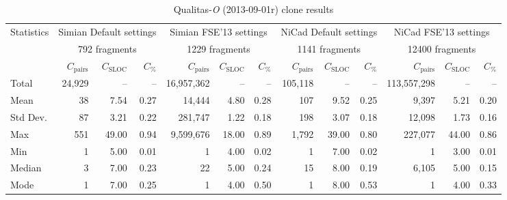 \documentclass{sig-alternate-05-2015}
\begin{document}
\begin{table}[h]
	\centering
	\caption{Qualitas-\textit{O} (2013-09-01r) clone results}
	\label{t_simian_raw_results}
	\small
		\begin{tabular}{l|r|r|r|r|r|r|r|r|r|r|r|r}
			\hline
			\multirow{3}{*}{Statistics} 
			& \multicolumn{3}{c|}{Simian Default settings} 
			& \multicolumn{3}{c|}{Simian FSE'13 settings}
			& \multicolumn{3}{c|}{NiCad Default settings} 
			& \multicolumn{3}{c}{NiCad FSE'13 settings} \\ \cline{2-13} 
			& \multicolumn{3}{c|}{792 fragments} 
			& \multicolumn{3}{c|}{1229 fragments}  
			& \multicolumn{3}{c|}{1141 fragments} 
			& \multicolumn{3}{c}{12400 fragments} \\ \cline{2-13}
			& $C_{\mathrm{pairs}}$ & $C_{\mathrm{SLOC}}$ & $C_{\mathrm{\%}}$ 
			& $C_{\mathrm{pairs}}$ & $C_{\mathrm{SLOC}}$ & $C_{\mathrm{\%}}$ 
			& $C_{\mathrm{pairs}}$ & $C_{\mathrm{SLOC}}$ & $C_{\mathrm{\%}}$
			& $C_{\mathrm{pairs}}$ & $C_{\mathrm{SLOC}}$ & $C_{\mathrm{\%}}$ \\ 
			\hline
			Total & 24,929 & -- & -- & 16,957,362 & --	& -- & 105,118 	& -- & -- & 113,557,298 & -- & -- \\
			Mean & 38 & 7.54 & 0.27 & 14,444 & 4.80 & 0.28 & 107 & 9.52 & 0.25 & 9,397 & 5.21 & 0.20 \\
			Std Dev. & 87 & 3.21 & 0.22 & 281,747 & 1.22 & 0.18 & 198 & 3.07 & 0.18 & 12,098 & 1.73 & 0.16 \\
			Max  & 551 & 49.00 & 0.94 & 9,599,676 & 18.00 & 0.89 & 1,792 & 39.00 & 0.80 & 227,077 & 44.00 & 0.86 \\
			Min  & 1 & 5.00 & 0.01 & 1 & 4.00 & 0.02 & 1 & 7.00 & 0.02 & 1 & 3.00 & 0.01 \\
			Median  & 3 & 7.00 & 0.23 & 22 & 5.00 & 0.24 & 15 & 8.00 & 0.19 & 6,105 & 5.00 	& 0.15 \\
			Mode  & 1 & 7.00 & 0.25 & 1 & 4.00 & 0.50 & 1 & 8.00 & 0.53 & 1 & 4.00 & 0.33 \\
			\hline
		\end{tabular} %
\end{table}
\end{document}

